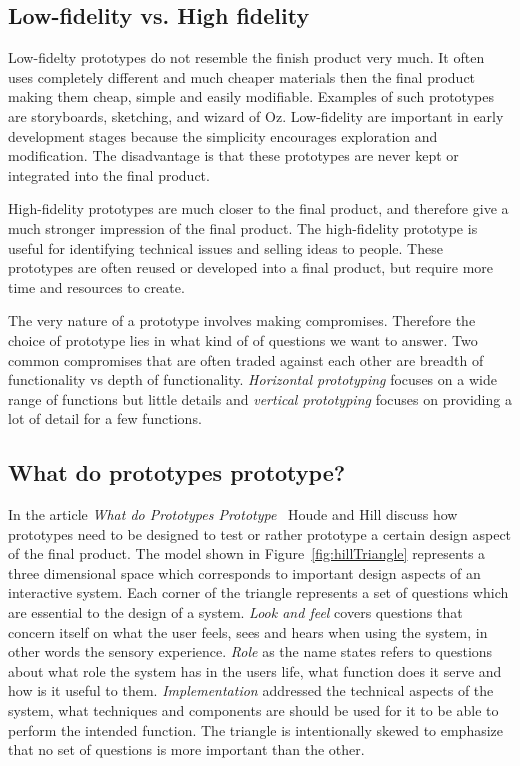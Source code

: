 \subsection{Low-fidelity vs. High fidelity}
Low-fidelty prototypes do not resemble the finish product very much. It often uses completely different and much cheaper materials then the final product making them cheap, simple and easily modifiable. Examples of such prototypes are storyboards, sketching, and wizard of Oz. Low-fidelity are important in early development stages because the simplicity encourages exploration and modification. The disadvantage is that these prototypes are never kept or integrated into the final product.

High-fidelity prototypes are much closer to the final product, and therefore give a much stronger impression of the final product. The high-fidelity prototype is useful for identifying technical issues and selling ideas to people. These prototypes are often reused or developed into a final product, but require more time and resources to create.

The very nature of a prototype involves making compromises. Therefore the choice of prototype lies in what kind of of questions we want to answer. Two common compromises that are often traded against each other are breadth of functionality vs depth of functionality. \textit{Horizontal prototyping} focuses on a wide range of functions but little details and \textit{vertical prototyping} focuses on providing a lot of detail for a few functions. 

\subsection{What do prototypes prototype?}
\label{sec:prototypesPrototype}
In the article \textit{What do Prototypes Prototype}~\cite{prototypesPrototype} Houde and Hill discuss how prototypes need to be designed to test or rather prototype a certain design aspect of the final product. The model shown in Figure~\ref{fig:hillTriangle} represents a three dimensional space which corresponds to important design aspects of an interactive system. Each corner of the triangle represents a set of questions which are essential to the design of a system. \textit{Look and feel} covers questions that concern itself on what the user feels, sees and hears when using the system, in other words the sensory experience. \textit{Role} as the name states refers to questions about what role the system has in the users life, what function does it serve and how is it useful to them. \textit{Implementation} addressed the technical aspects of the system, what techniques and components are should be used for it to be able to perform the intended function. The triangle is intentionally skewed to emphasize that no set of questions is more important than the other.


